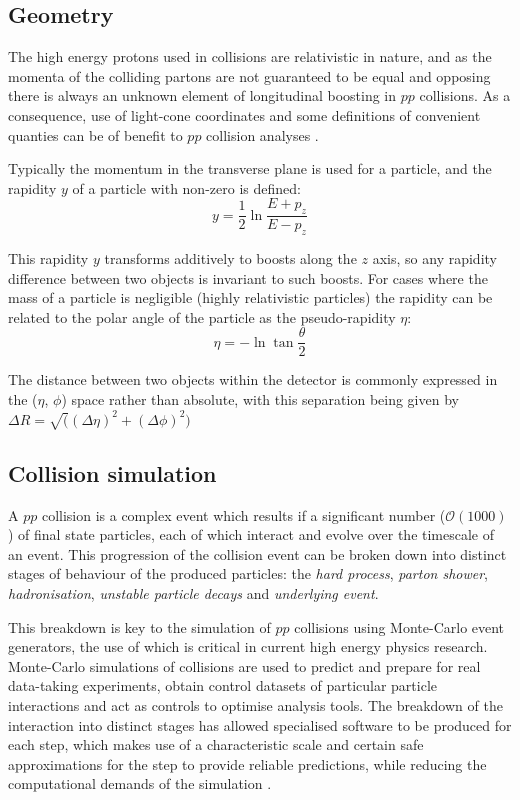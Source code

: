 	\subsection{Geometry}
	\label{t:geometry}

	The high energy protons used in collisions are relativistic in nature, and as the momenta of the colliding partons are not guaranteed to be equal and opposing there is always an unknown element of longitudinal boosting in $pp$ collisions. As a consequence, use of light-cone coordinates and some definitions of convenient quanties can be of benefit to $pp$ collision analyses \cite{lightcone-all-that}.

	Typically the momentum in the transverse plane \pt is used for a particle, and the rapidity $y$ of a particle with non-zero \pt is defined:
	\begin{equation}
	y = \frac{1}{2}\ln\frac{E+p_z}{E- p_z}
	\end{equation}

	This rapidity $y$ transforms additively to boosts along the $z$ axis, so any rapidity difference between two objects is invariant to such boosts. For cases where the mass of a particle is negligible (highly relativistic particles) the rapidity can be related to the polar angle of the particle as the pseudo-rapidity $\eta$:
	\begin{equation}
	\eta = -\ln\tan\frac{\theta}{2}
	\end{equation}

	The distance between two objects within the detector is commonly expressed in the ($\eta$, $\phi$) space rather than absolute, with this separation being given by $\Delta R = \sqrt((\Delta\eta)^2 + (\Delta\phi)^2)$

	\subsection{Collision simulation}

	A $pp$ collision is a complex event which results if a significant number ($\mathcal{O}(1000)$) of final state particles, each of which interact and evolve over the timescale of an event. This progression of the collision event can be broken down into distinct stages of behaviour of the produced particles: the \textit{hard process}, \textit{parton shower}, \textit{hadronisation}, \textit{unstable particle decays} and \textit{underlying event}.

	This breakdown is key to the simulation of $pp$ collisions using Monte-Carlo event generators, the use of which is critical in current high energy physics research. Monte-Carlo simulations of collisions are used to predict and prepare for real data-taking experiments, obtain control datasets of particular particle interactions and act as controls to optimise analysis tools. The breakdown of the interaction into distinct stages has allowed specialised software to be produced for each step, which makes use of a characteristic scale and certain safe approximations for the step to provide reliable predictions, while reducing the computational demands of the simulation \cite{monte-carlo}.

